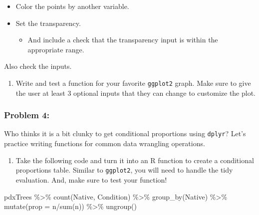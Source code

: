 \documentclass[
]{article}
\newenvironment{Shaded}{\begin{snugshade}}{\end{snugshade}}
\newcommand{\AttributeTok}[1]{\textcolor[rgb]{0.77,0.63,0.00}{#1}}
\newcommand{\FunctionTok}[1]{\textcolor[rgb]{0.00,0.00,0.00}{#1}}
\newcommand{\NormalTok}[1]{#1}
\newcommand{\SpecialCharTok}[1]{\textcolor[rgb]{0.00,0.00,0.00}{#1}}
\providecommand{\tightlist}{%
  \setlength{\itemsep}{0pt}\setlength{\parskip}{0pt}}
\begin{document}
\begin{itemize}
\tightlist
\item
  Color the points by another variable.
\item
  Set the transparency.

  \begin{itemize}
  \tightlist
  \item
    And include a check that the transparency input is within the
    appropriate range.
  \end{itemize}
\end{itemize}

Also check the inputs.

\begin{enumerate}
\def\labelenumi{\alph{enumi}.}
\setcounter{enumi}{3}
\tightlist
\item
  Write and test a function for your favorite \texttt{ggplot2} graph.
  Make sure to give the user at least 3 optional inputs that they can
  change to customize the plot.
\end{enumerate}

\hypertarget{problem-4}{%
\subsubsection{Problem 4:}\label{problem-4}}

Who thinks it is a bit clunky to get conditional proportions using
\texttt{dplyr}? Let's practice writing functions for common data
wrangling operations.

\begin{enumerate}
\def\labelenumi{\alph{enumi}.}
\tightlist
\item
  Take the following code and turn it into an R function to create a
  conditional proportions table. Similar to \texttt{ggplot2}, you will
  need to handle the tidy evaluation. And, make sure to test your
  function!
\end{enumerate}

\begin{Shaded}
\begin{Highlighting}[]
\NormalTok{pdxTrees }\SpecialCharTok{\%\textgreater{}\%}
  \FunctionTok{count}\NormalTok{(Native, Condition) }\SpecialCharTok{\%\textgreater{}\%}
  \FunctionTok{group\_by}\NormalTok{(Native) }\SpecialCharTok{\%\textgreater{}\%}
  \FunctionTok{mutate}\NormalTok{(}\AttributeTok{prop =}\NormalTok{ n}\SpecialCharTok{/}\FunctionTok{sum}\NormalTok{(n)) }\SpecialCharTok{\%\textgreater{}\%}
  \FunctionTok{ungroup}\NormalTok{()}
\end{Highlighting}
\end{Shaded}
\end{document}
